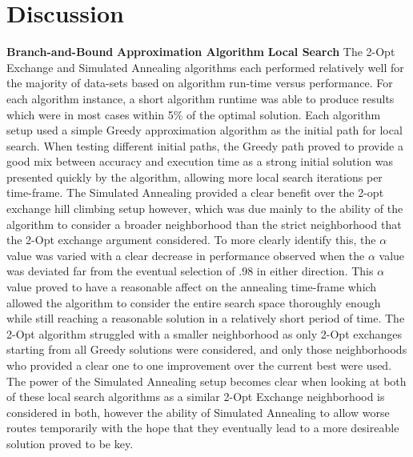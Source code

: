 \documentclass[format=sigconf]{acmart}
\begin{document}
\section*{Discussion}
\textbf{Branch-and-Bound}\newline
\textbf{Approximation Algorithm}\newline
\textbf{Local Search} The 2-Opt Exchange and Simulated Annealing algorithms each performed relatively 
well for the majority of data-sets based on algorithm run-time versus performance. For each algorithm instance, a short
algorithm runtime was able to produce results which were in most cases within 5\% of the optimal solution. Each algorithm setup 
used a simple Greedy approximation algorithm as the initial path for local search. When testing different initial paths, the Greedy path 
proved to provide a good mix between accuracy and execution time as a strong initial solution was presented quickly by the algorithm, allowing more local 
search iterations per time-frame. The Simulated Annealing 
provided a clear benefit over the 2-opt exchange hill climbing setup however, which was due mainly to the ability of the algorithm to consider 
a broader neighborhood than the strict neighborhood that the 2-Opt exchange argument considered. To more clearly identify this, the $\alpha$ value was 
varied with a clear decrease in performance observed when the $\alpha$ value was deviated far from the eventual selection of .98 in either direction. 
This $\alpha$ value proved to have a reasonable affect on the annealing time-frame which allowed the algorithm to consider the entire search space thoroughly enough 
while still reaching a reasonable solution in a relatively short period of time. The 2-Opt algorithm struggled with a smaller neighborhood as only 2-Opt exchanges starting from 
all Greedy solutions were considered, and only those neighborhoods who provided a clear one to one improvement over the current best were used. The power of the Simulated Annealing setup 
becomes clear when looking at both of these local search algorithms as a similar 2-Opt Exchange neighborhood is considered in both, however the ability of Simulated Annealing to 
allow worse routes temporarily with the hope that they eventually lead to a more desireable solution proved to be key.
\end{document}

